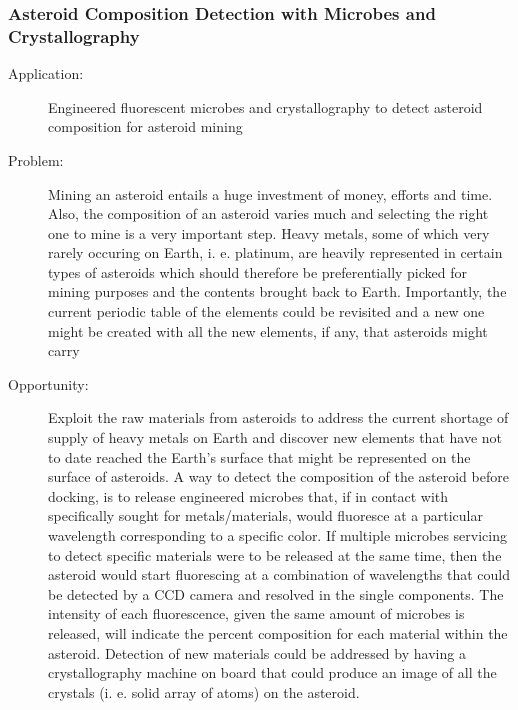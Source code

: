  \subsubsection{Asteroid Composition Detection with Microbes and Crystallography}
\begin{description}
\item[Application:] Engineered fluorescent microbes and \gls{crystallography} to detect asteroid composition for asteroid mining
\item[Problem:] Mining an asteroid entails a huge investment of money, efforts and time. Also, the composition of an asteroid varies much and selecting the right one to mine is a very important step. Heavy metals, some of which very rarely occuring on Earth, i. e. platinum, are heavily represented in certain types of asteroids \cite{Kargel} which should therefore be preferentially picked for mining purposes and the contents brought back to Earth. Importantly, the current periodic table of the elements could be revisited and a new one might be created with all the new elements, if any, that asteroids might carry
\item[Opportunity:] Exploit the raw materials from asteroids to address the current shortage of supply of heavy metals on Earth and discover new elements that have not to date reached the Earth's surface that might be represented on the surface of asteroids. A way to detect the composition of the asteroid before docking, is to release engineered microbes that, if in contact with specifically sought for metals/materials, would fluoresce at a particular wavelength corresponding to a specific color. If multiple microbes servicing to detect specific materials were to be released at the same time, then the asteroid would start fluorescing at a combination of wavelengths that could be detected by a \gls{CCD} camera and resolved in the single components. The intensity of each fluorescence, given the same amount of microbes is released, will indicate the percent composition for each material within the asteroid. Detection of new materials could be addressed by having a \gls{crystallography} machine on board that could produce an image of all the crystals (i. e. solid array of atoms) on the asteroid.


\end{description}
